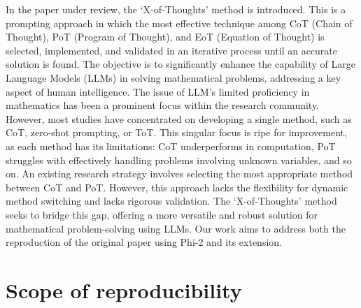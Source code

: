 \documentclass[10pt]{article} %
\begin{document}
In the paper under review, the `X-of-Thoughts' method is introduced. This is a prompting approach in which the most effective technique among CoT (Chain of Thought), PoT (Program of Thought), and EoT (Equation of Thought) is selected, implemented, and validated in an iterative process until an accurate solution is found. 
The objective is to significantly enhance the capability of Large Language Models (LLMs) in solving mathematical problems, addressing a key aspect of human intelligence. The issue of LLM's limited proficiency in mathematics has been a prominent focus within the research community. However, most studies have concentrated on developing a single method, such as CoT, zero-shot prompting, or ToT. This singular focus is ripe for improvement, as each method has its limitations: CoT underperforms in computation, PoT struggles with effectively handling problems involving unknown variables, and so on. 
An existing research strategy involves selecting the most appropriate method between CoT and PoT. However, this approach lacks the flexibility for dynamic method switching and lacks rigorous validation. The `X-of-Thoughts' method seeks to bridge this gap, offering a more versatile and robust solution for mathematical problem-solving using LLMs. 
Our work aims to address both the reproduction of the original paper using Phi-2 and its extension.





\section{Scope of reproducibility}
\label{gen_inst}
\end{document}
